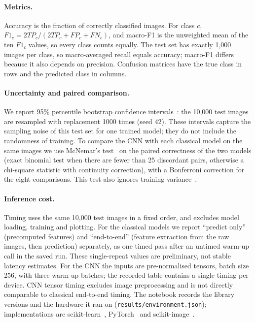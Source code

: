 \documentclass[conference]{IEEEtran}
\begin{document}
\paragraph{Metrics.}
Accuracy is the fraction of correctly classified images. For class $c$, $F1_c = 2TP_c/(2TP_c+FP_c+FN_c)$, and
macro-F1 is the unweighted mean of the ten $F1_c$ values, so every class counts equally. The test set has exactly
1{,}000 images per class, so macro-averaged recall equals accuracy; macro-F1 differs because it also depends on
precision. Confusion matrices have the true class in rows and the predicted class in columns.

\paragraph{Uncertainty and paired comparison.}
We report 95\% percentile bootstrap confidence intervals~\cite{efron1979bootstrap}: the 10{,}000 test images are
resampled with replacement 1000 times (seed 42). These intervals capture the sampling noise of this test set for one
trained model; they do not include the randomness of training. To compare the CNN with each classical model on the
same images we use McNemar's test~\cite{mcnemar1947note} on the paired correctness of the two models (exact binomial
test when there are fewer than 25 discordant pairs, otherwise a chi-square statistic with continuity correction), with a
Bonferroni correction for the eight comparisons. This test also ignores training variance~\cite{dietterich1998approximate}.

\paragraph{Inference cost.}
Timing uses the same 10{,}000 test images in a fixed order, and excludes model loading, training and plotting. For the
classical models we report ``predict only'' (precomputed features) and ``end-to-end'' (feature extraction from the raw
images, then prediction) separately, as one timed pass after an untimed warm-up call in the saved run. These single-repeat values are preliminary, not stable latency estimates. For the CNN the inputs
are pre-normalised tensors, batch size 256, with three warm-up batches; the recorded table contains a single timing per device. CNN tensor timing excludes image preprocessing and is not directly comparable to classical end-to-end timing. The notebook records the library versions and the hardware it ran on
(\texttt{results/environment.json}); implementations are scikit-learn~\cite{pedregosa2011scikit},
PyTorch~\cite{paszke2019pytorch} and scikit-image~\cite{vanderwalt2014scikit}.
\end{document}
